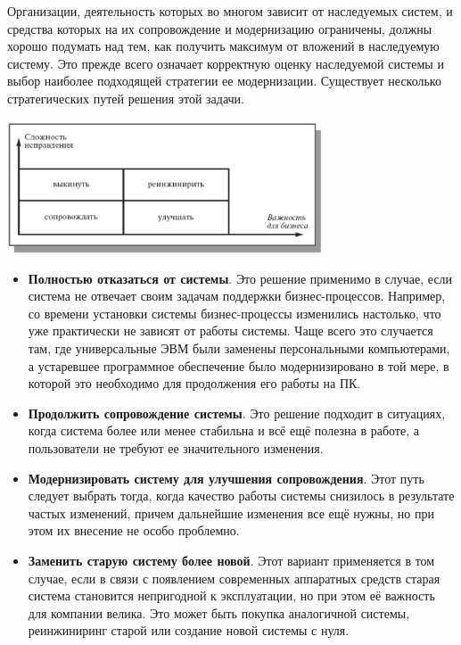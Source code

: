 \documentclass{../../text-style}
\begin{document}
Организации, деятельность которых во многом зависит от наследуемых систем, и средства которых на их сопровождение и модернизацию ограничены, должны хорошо подумать над тем, как получить максимум от вложений в наследуемую систему. Это прежде всего означает корректную оценку наследуемой системы и выбор наиболее подходящей стратегии ее модернизации. Существует несколько стратегических путей решения этой задачи.

\begin{center}
    \includegraphics[width=0.7\textwidth]{maintenanceWays.png}
\end{center}

\begin{itemize}
    \item \textbf{Полностью отказаться от системы}. Это решение применимо в случае, если система не отвечает своим задачам поддержки бизнес-процессов. Например, со времени установки системы бизнес-процессы изменились настолько, что уже практически не зависят от работы системы. Чаще всего это случается там, где универсальные ЭВМ были заменены персональными компьютерами, а устаревшее программное обеспечение было модернизировано в той мере, в которой это необходимо для продолжения его работы на ПК.
    \item \textbf{Продолжить сопровождение системы}. Это решение подходит в ситуациях, когда система более или менее стабильна и всё ещё полезна в работе, а пользователи не требуют ее значительного изменения.
    \item \textbf{Модернизировать систему для улучшения сопровождения}. Этот путь следует выбрать тогда, когда качество работы системы снизилось в результате частых изменений, причем дальнейшие изменения все ещё нужны, но при этом их внесение не особо проблемно.
    \item \textbf{Заменить старую систему более новой}. Этот вариант применяется в том случае, если в связи с появлением современных аппаратных средств старая система становится непригодной к эксплуатации, но при этом её важность для компании велика. Это может быть покупка аналогичной системы, реинжиниринг старой или создание новой системы с нуля.
\end{itemize}
\end{document}
